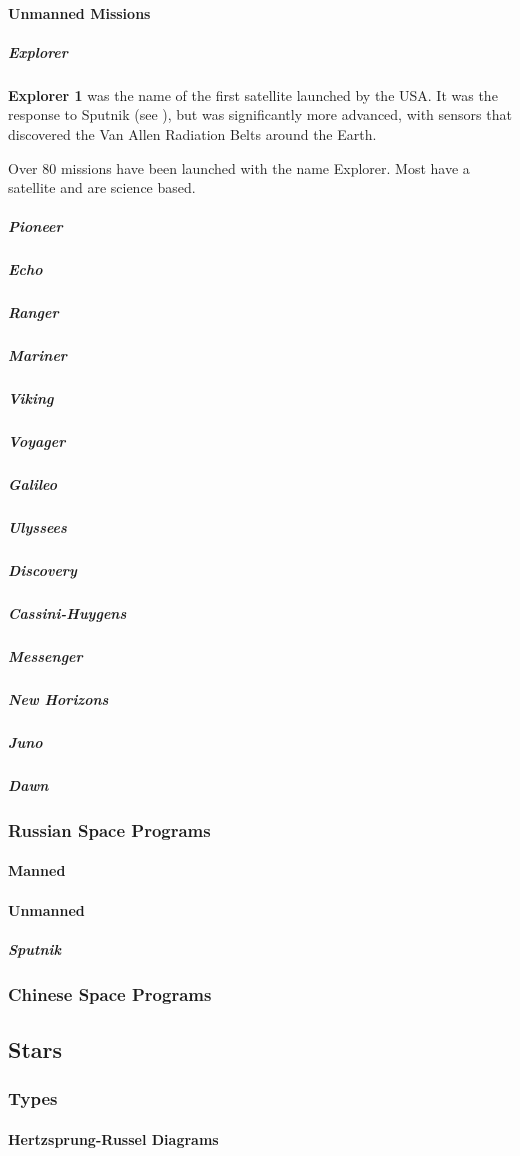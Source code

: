 				\paragraph{Unmanned Missions}
					\subparagraph{Explorer}
						\textbf{Explorer 1} was the name of the first satellite launched by the USA.  It was the response to Sputnik (see ), but was significantly more advanced, with sensors that discovered the Van Allen Radiation Belts around the Earth. 
						
						Over 80 missions have been launched with the name Explorer.  Most have a satellite and are science based. 
				
					\subparagraph{Pioneer}
					\subparagraph{Echo}
					\subparagraph{Ranger}
					\subparagraph{Mariner}
					\subparagraph{Viking}
					\subparagraph{Voyager}
					\subparagraph{Galileo}
					\subparagraph{Ulyssees}
					\subparagraph{Discovery}
					\subparagraph{Cassini-Huygens}
					\subparagraph{Messenger}
					\subparagraph{New Horizons}
					\subparagraph{Juno}
					\subparagraph{Dawn}
					
					
					
			\subsubsection{Russian Space Programs}
				\paragraph {Manned}
				\paragraph {Unmanned}
					\subparagraph{Sputnik} \label{sputnik}
				
			\subsubsection{Chinese Space Programs}
		\subsection{Stars}
			\subsubsection{Types}
				\paragraph{Hertzsprung-Russel Diagrams}
